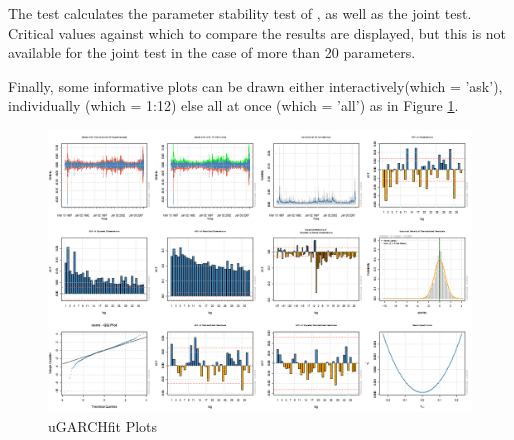 The \verb@nymblom@ test calculates the parameter stability test of \cite{Nyblom1989},
as well as the joint test. Critical values against which to compare the results
are displayed, but this is not available for the joint test in the case of more than 20
parameters.

Finally, some informative plots can be drawn either interactively(which = 'ask'),
individually (which = 1:12) else all at once (which = 'all') as in Figure
\ref{fig:fitplot}.

\begin{landscape}
\begin{figure}[!ht]
\centering
\includegraphics[width=22cm]{fitplot.png}
\caption[uGARCHfit Plots]{uGARCHfit Plots}\label{fig:fitplot}
\end{figure}
\end{landscape}

